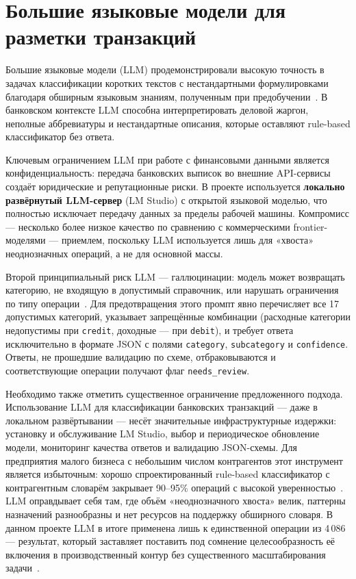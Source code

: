 \section{Большие языковые модели для разметки транзакций}

Большие языковые модели (LLM) продемонстрировали высокую точность в задачах классификации коротких текстов с нестандартными формулировками благодаря обширным языковым знаниям, полученным при предобучении~\cite{brown2020language}. В банковском контексте LLM способна интерпретировать деловой жаргон, неполные аббревиатуры и нестандартные описания, которые оставляют rule-based классификатор без ответа.

Ключевым ограничением LLM при работе с финансовыми данными является конфиденциальность: передача банковских выписок во внешние API-сервисы создаёт юридические и репутационные риски. В проекте используется \textbf{локально развёрнутый LLM-сервер} (LM Studio) с открытой языковой моделью, что полностью исключает передачу данных за пределы рабочей машины. Компромисс --- несколько более низкое качество по сравнению с коммерческими frontier-моделями --- приемлем, поскольку LLM используется лишь для «хвоста» неоднозначных операций, а не для основной массы.

Второй принципиальный риск LLM --- галлюцинации: модель может возвращать категорию, не входящую в допустимый справочник, или нарушать ограничения по типу операции~\cite{ji2023survey}. Для предотвращения этого промпт явно перечисляет все 17 допустимых категорий, указывает запрещённые комбинации (расходные категории недопустимы при \texttt{credit}, доходные --- при \texttt{debit}), и требует ответа исключительно в формате JSON с полями \texttt{category}, \texttt{subcategory} и \texttt{confidence}. Ответы, не прошедшие валидацию по схеме, отбраковываются и соответствующие операции получают флаг \texttt{needs\_review}.

Необходимо также отметить существенное ограничение предложенного подхода. Использование LLM для классификации банковских транзакций --- даже в локальном развёртывании --- несёт значительные инфраструктурные издержки: установку и обслуживание LM Studio, выбор и периодическое обновление модели, мониторинг качества ответов и валидацию JSON-схемы. Для предприятия малого бизнеса с небольшим числом контрагентов этот инструмент является избыточным: хорошо спроектированный rule-based классификатор с контрагентным словарём закрывает 90--95\% операций с высокой уверенностью~\cite{Cohen1995}. LLM оправдывает себя там, где объём «неоднозначного хвоста» велик, паттерны назначений разнообразны и нет ресурсов на поддержку обширного словаря. В данном проекте LLM в итоге применена лишь к единственной операции из 4\,086 --- результат, который заставляет поставить под сомнение целесообразность её включения в производственный контур без существенного масштабирования задачи~\cite{sculley2015hidden}.

